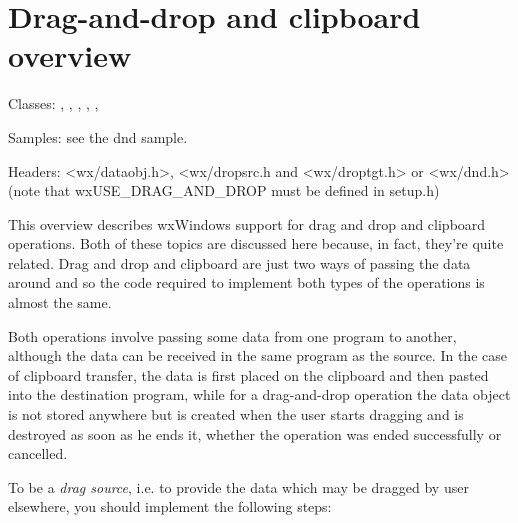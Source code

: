 \section{Drag-and-drop and clipboard overview}\label{wxdndoverview}

Classes: , 
, 
, 
, 
, 

Samples: see the dnd sample.

Headers: <wx/dataobj.h>, <wx/dropsrc.h and <wx/droptgt.h> or <wx/dnd.h>
(note that wxUSE\_DRAG\_AND\_DROP must be defined in setup.h)

This overview describes wxWindows support for drag and drop and clipboard
operations. Both of these topics are discussed here because, in fact, they're
quite related. Drag and drop and clipboard are just two ways of passing the
data around and so the code required to implement both types of the operations
is almost the same.

Both operations involve passing some data from one program to another,
although the data can be received in the same program as the source. In the case
of clipboard transfer, the data is first placed on the clipboard and then
pasted into the destination program, while for a drag-and-drop operation the
data object is not stored anywhere but is created when the user starts
dragging and is destroyed as soon as he ends it, whether the operation was
ended successfully or cancelled.

To be a {\it drag source}, i.e. to provide the data which may be dragged by
user elsewhere, you should implement the following steps:


